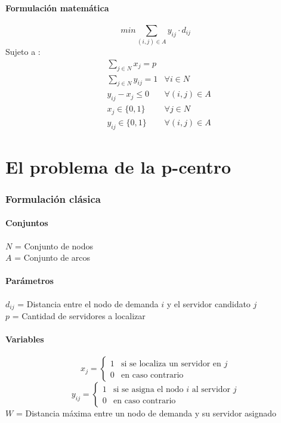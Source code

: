 \documentclass{article}
\numberwithin{equation}{section}
\begin{document}
\subsection{Formulación matemática}
\begin{equation}
min \sum_{(i,j) \in A} y_{ij} \cdot d_{ij}
\end{equation}
Sujeto a : \begin{align}
& \sum_{j \in N} x_{j} = p \\
& \sum_{j \in N} y_{ij} = 1 &\forall i \in N \\
& y_{ij} - x_{j} \leq 0 &\forall (i,j) \in A \\
& x_{j} \in \{0,1\} &\forall j \in N\\
& y_{ij} \in \{0,1\} &\forall (i,j) \in A
\end{align}

\newpage
\part{El problema de la p-centro}
\section{Formulación clásica}
\subsection{Conjuntos}
$N$ = Conjunto de nodos\\
$A$ = Conjunto de arcos
\subsection{Parámetros}
$d_{ij}$ = Distancia entre el nodo de demanda $i$ y el servidor candidato $j$\\
$p$ = Cantidad de servidores a localizar
\subsection{Variables}
\begin{center}
\[x_{j}={\begin{cases}1&{\mbox{si se localiza un servidor en $j$}}\\0&{\mbox{en caso contrario}}\end{cases}}
\]
\[y_{ij}={\begin{cases}1&{\mbox{si se asigna el nodo $i$ al servidor $j$}}\\0&{\mbox{en caso contrario}}\end{cases}}
\]
$W$ = Distancia máxima entre un nodo de demanda y su servidor asignado
\end{center}
\end{document}
